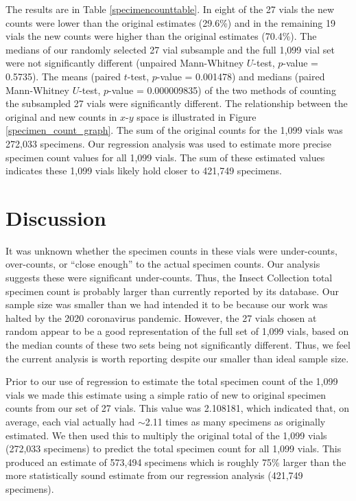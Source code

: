 \begin{multicols}{2}
The results are in Table \ref{specimencounttable}. In eight of the 27 vials the new counts were lower than the original estimates (29.6\%) and in the remaining 19 vials the new counts were higher than the original estimates (70.4\%). The medians of our randomly selected 27 vial subsample and the full 1,099 vial set were not significantly different (unpaired Mann-Whitney $U$-test, $p$-value = 0.5735).  The means (paired $t$-test, $p$-value = 0.001478) and medians (paired Mann-Whitney $U$-test, $p$-value = 0.000009835) of the two methods of counting the subsampled 27 vials were significantly different. The relationship between the original and new counts in $x$-$y$ space is illustrated in Figure \ref{specimen_count_graph}. The sum of the original counts for the 1,099 vials was 272,033 specimens. Our regression analysis was used to estimate more precise specimen count values for all 1,099 vials. The sum of these estimated values indicates these 1,099 vials likely hold closer to 421,749 specimens.

\section{Discussion} 
	
It was unknown whether the specimen counts in these vials were under-counts, over-counts, or “close enough” to the actual specimen counts. Our analysis suggests these were significant under-counts. Thus, the  Insect Collection total specimen count is probably larger than currently reported by its database. Our sample size was smaller than we had intended it to be because our work was halted by the 2020 coronavirus pandemic. However, the 27 vials chosen at random appear to be a good representation of the full set of 1,099 vials, based on the median counts of these two sets being not significantly different. Thus, we feel the current analysis is worth reporting despite our smaller than ideal sample size.



Prior to our use of regression to estimate the total specimen count of the 1,099 vials we made this estimate using a simple ratio of new to original specimen counts from our set of 27 vials. This value was 2.108181, which indicated that, on average, each vial actually had $\sim$2.11 times as many specimens as originally estimated. We then used this to multiply the original total of the 1,099 vials (272,033 specimens) to predict the total specimen count for all 1,099 vials. This produced an estimate of 573,494 specimens which is roughly 75\% larger than the more statistically sound estimate from our regression analysis (421,749 specimens).


\end{multicols}

